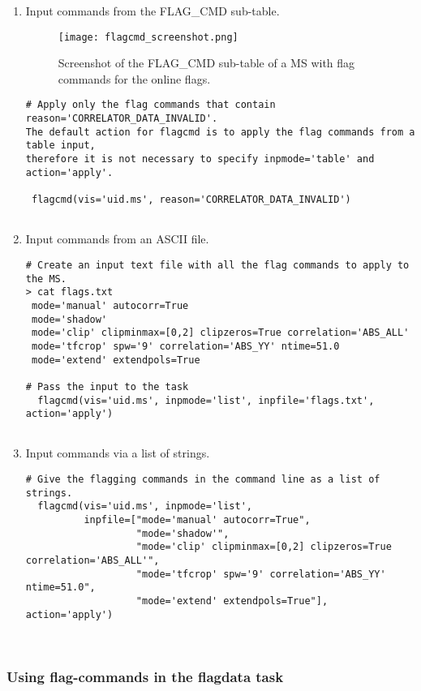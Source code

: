 \begin{enumerate}
\item Input commands from the FLAG\_CMD sub-table. 

\begin{figure}
\texttt{[image: flagcmd\_screenshot.png]}
\caption{Screenshot of the FLAG_CMD sub-table of a MS with flag commands for the
online flags. }
\end{figure}

\begin{verbatim}
# Apply only the flag commands that contain reason='CORRELATOR_DATA_INVALID'.
The default action for flagcmd is to apply the flag commands from a table input,
therefore it is not necessary to specify inpmode='table' and action='apply'.

 flagcmd(vis='uid.ms', reason='CORRELATOR_DATA_INVALID')
  
\end{verbatim}

\item Input commands from an ASCII file.
\begin{verbatim}
# Create an input text file with all the flag commands to apply to the MS.
> cat flags.txt
 mode='manual' autocorr=True
 mode='shadow'
 mode='clip' clipminmax=[0,2] clipzeros=True correlation='ABS_ALL'
 mode='tfcrop' spw='9' correlation='ABS_YY' ntime=51.0
 mode='extend' extendpols=True

# Pass the input to the task
  flagcmd(vis='uid.ms', inpmode='list', inpfile='flags.txt', action='apply')
 
\end{verbatim}

\item Input commands via a list of strings.
\begin{verbatim}
# Give the flagging commands in the command line as a list of strings.
  flagcmd(vis='uid.ms', inpmode='list',
          inpfile=["mode='manual' autocorr=True",
                   "mode='shadow'",
                   "mode='clip' clipminmax=[0,2] clipzeros=True correlation='ABS_ALL'", 
                   "mode='tfcrop' spw='9' correlation='ABS_YY' ntime=51.0",
                   "mode='extend' extendpols=True"], action='apply')
 
 
\end{verbatim}
\end{enumerate}

\subsubsection{Using flag-commands in the flagdata task}

